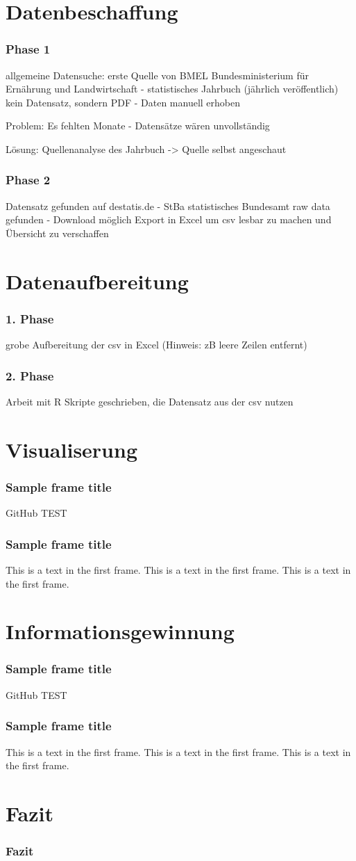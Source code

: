 \documentclass{beamer}
\begin{document}
\section{Datenbeschaffung}
\begin{frame}
	\frametitle{Phase 1}
	allgemeine Datensuche: erste Quelle von 
	BMEL Bundesministerium für Ernährung und Landwirtschaft - statistisches Jahrbuch (jährlich veröffentlich)
	kein Datensatz, sondern PDF - Daten manuell erhoben

	Problem: Es fehlten Monate - Datensätze wären unvollständig

	Lösung: Quellenanalyse des Jahrbuch -> Quelle selbst angeschaut 

\end{frame}

\begin{frame}
	\frametitle{Phase 2}
	Datensatz gefunden auf destatis.de - StBa statistisches Bundesamt 
	raw data gefunden - Download möglich
	Export in Excel um csv lesbar zu machen und Übersicht zu verschaffen
\end{frame}

\section{Datenaufbereitung}
\begin{frame}
	\frametitle{1. Phase}
	grobe Aufbereitung der csv in Excel (Hinweis: zB leere Zeilen entfernt)
\end{frame}
\begin{frame}
	\frametitle{2. Phase}
	Arbeit mit R
	Skripte geschrieben, die Datensatz aus der csv nutzen
\end{frame}

\section{Visualiserung}
\begin{frame}
\frametitle{Sample frame title}
GitHub TEST
\end{frame}
\begin{frame}
\frametitle{Sample frame title}
This is a text in the first frame. This is a text in the first frame. This is a text in the first frame.
\end{frame}

\section{Informationsgewinnung}
\begin{frame}
\frametitle{Sample frame title}
GitHub TEST
\end{frame}
\begin{frame}
\frametitle{Sample frame title}
This is a text in the first frame. This is a text in the first frame. This is a text in the first frame.
\end{frame}

\section{Fazit}
\begin{frame}
	\frametitle{Fazit}
\end{frame}

\end{document}

